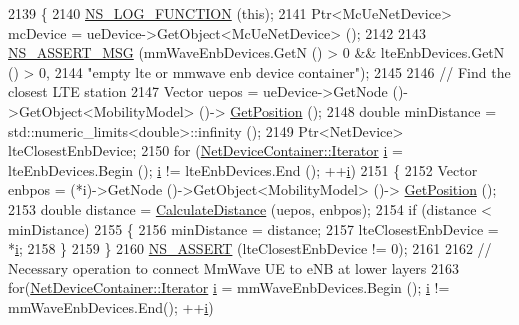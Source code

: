 \begin{DoxyCode}
2139 \{
2140         \hyperlink{log-macros-disabled_8h_a90b90d5bad1f39cb1b64923ea94c0761}{NS\_LOG\_FUNCTION} (\textcolor{keyword}{this});
2141         Ptr<McUeNetDevice> mcDevice = ueDevice->GetObject<McUeNetDevice> ();
2142         
2143         \hyperlink{assert_8h_aff5ece9066c74e681e74999856f08539}{NS\_ASSERT\_MSG} (mmWaveEnbDevices.GetN () > 0 && lteEnbDevices.GetN () > 0, 
2144                 \textcolor{stringliteral}{"empty lte or mmwave enb device container"});
2145         
2146         \textcolor{comment}{// Find the closest LTE station}
2147         Vector uepos = ueDevice->GetNode ()->GetObject<MobilityModel> ()->
      \hyperlink{lena-cqi-threshold_8cc_acebf763e1a0478cec225f9547941ae54}{GetPosition} ();
2148         \textcolor{keywordtype}{double} minDistance = std::numeric\_limits<double>::infinity ();
2149         Ptr<NetDevice> lteClosestEnbDevice;
2150         \textcolor{keywordflow}{for} (\hyperlink{classns3_1_1NetDeviceContainer_a45709bb572f975569ed985fa89b132f8}{NetDeviceContainer::Iterator} \hyperlink{bernuolliDistribution_8m_a6f6ccfcf58b31cb6412107d9d5281426}{i} = lteEnbDevices.Begin (); 
      \hyperlink{bernuolliDistribution_8m_a6f6ccfcf58b31cb6412107d9d5281426}{i} != lteEnbDevices.End (); ++\hyperlink{bernuolliDistribution_8m_a6f6ccfcf58b31cb6412107d9d5281426}{i})
2151         \{
2152           Vector enbpos = (*i)->GetNode ()->GetObject<MobilityModel> ()->
      \hyperlink{lena-cqi-threshold_8cc_acebf763e1a0478cec225f9547941ae54}{GetPosition} ();
2153           \textcolor{keywordtype}{double} distance = \hyperlink{namespacens3_aaae60adf695e280c4882ced6041d1628}{CalculateDistance} (uepos, enbpos);
2154           \textcolor{keywordflow}{if} (distance < minDistance)
2155             \{
2156               minDistance = distance;
2157               lteClosestEnbDevice = *\hyperlink{bernuolliDistribution_8m_a6f6ccfcf58b31cb6412107d9d5281426}{i};
2158             \}
2159         \}
2160         \hyperlink{assert_8h_a6dccdb0de9b252f60088ce281c49d052}{NS\_ASSERT} (lteClosestEnbDevice != 0);
2161 
2162         \textcolor{comment}{// Necessary operation to connect MmWave UE to eNB at lower layers}
2163         \textcolor{keywordflow}{for}(\hyperlink{classns3_1_1NetDeviceContainer_a45709bb572f975569ed985fa89b132f8}{NetDeviceContainer::Iterator} \hyperlink{bernuolliDistribution_8m_a6f6ccfcf58b31cb6412107d9d5281426}{i} = mmWaveEnbDevices.Begin (); 
      \hyperlink{bernuolliDistribution_8m_a6f6ccfcf58b31cb6412107d9d5281426}{i} != mmWaveEnbDevices.End(); ++\hyperlink{bernuolliDistribution_8m_a6f6ccfcf58b31cb6412107d9d5281426}{i})

\end{DoxyCode}
